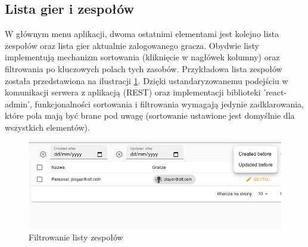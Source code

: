 \subsection{Lista gier i zespołów}
W głównym menu aplikacji, dwoma ostatnimi elementami jest kolejno lista zespołów oraz lista gier aktualnie zalogowanego gracza. Obydwie listy implementują mechanizm sortowania (kliknięcie w nagłówek kolumny) oraz filtrowania po kluczowych polach tych zasobów. Przykładowa lista zespołów została przedstawiona na ilustracji \ref{fig:list-filters}.
Dzięki ustandaryzowanemu podejściu w komunikacji serwera z aplikacją (REST) oraz implementacji biblioteki 'react-admin', funkcjonalności sortowania i filtrowania wymagają jedynie zadklarowania, które pola mają być brane pod uwagę (sortowanie ustawione jest domyślnie dla wszystkich elementów).

\begin{figure}[h!]
  \centering
    \includegraphics[width=\textwidth]{images/player/listFilters.png}
  \caption{Filtrowanie listy zespołów}
  \label{fig:list-filters}
\end{figure}
